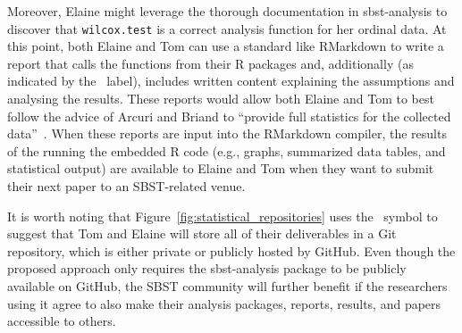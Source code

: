 Moreover, Elaine might leverage the thorough documentation in sbst-analysis to discover that {\tt wilcox.test} is a
correct analysis function for her ordinal data. At this point, both Elaine and Tom can use a standard like RMarkdown to
write a report that calls the functions from their R packages and, additionally (as indicated by the
\codeeditgit~label), includes written content explaining the assumptions and analysing the results. These reports would
allow both Elaine and Tom to best follow the advice of Arcuri and Briand to ``provide full statistics for the collected
data''~\cite{Arcuri2014}. When these reports are input into the RMarkdown compiler, the results of the running the
embedded R code (e.g., graphs, summarized data tables, and statistical output) are available to Elaine and Tom when they
want to submit their next paper to an SBST-related venue.

It is worth noting that Figure~\ref{fig:statistical_repositories} uses the \faGit~symbol to suggest that Tom and Elaine
will store all of their deliverables in a Git repository, which is either private or publicly hosted by GitHub. Even though
the proposed approach only requires the sbst-analysis package to be publicly available on GitHub, the SBST community will further
benefit if the researchers using it agree to also make their analysis packages, reports, results, and papers accessible
to others.
